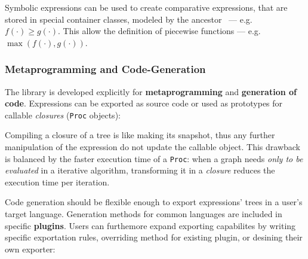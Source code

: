 \noindent%



Symbolic expressions can be used to create comparative expressions, that are stored in special container classes, modeled by the ancestor \CASExpression~--- e.g. $f(\cdot) \geq g(\cdot)$. This allow the definition of piecewise functions --- e.g. $\max(f(\cdot), g(\cdot))$.

\noindent%


\subsubsection{Metaprogramming and Code-Generation}

The library is developed explicitly for \textbf{meta\-programming} and \textbf{generation of code}. Expressions can be exported as source code or used as prototypes for callable \emph{closures} (\texttt{Proc} objects):

\noindent%


Compiling a closure of a tree is like making its snapshot, thus any further manipulation of the expression do not update the callable object. This drawback is balanced by the faster execution time of a \texttt{Proc}: when a graph needs \emph{only to be evaluated} in a iterative algorithm, transforming it in a \emph{closure} reduces the execution time per iteration.

Code generation should be flexible enough to export expressions' trees in a user's target language. Generation methods for common languages are included in specific \textbf{plugins}. Users can furthemore expand exporting capabilites by writing specific exportation rules,  overriding method for existing plugin, or desining their own exporter:

\noindent%

